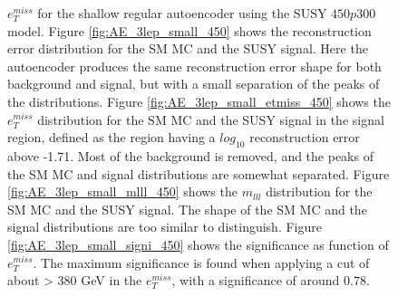 \begin{figure}[!htb]
{    $e_T^{miss}$ for the shallow regular autoencoder using the SUSY $450p300$ model. Figure \ref{fig:AE_3lep_small_450} shows the reconstruction error 
    distribution for the SM MC and the SUSY signal. Here the autoencoder produces the same reconstruction error shape for both background and 
    signal, but with a small separation of the peaks of the distributions. Figure \ref{fig:AE_3lep_small_etmiss_450} shows the $e_T^{miss}$ 
    distribution for the SM MC and the SUSY signal in the signal region, defined as the region having a $log_{10}$ 
    reconstruction error above -1.71. Most of 
    the background is removed, and the peaks of the SM MC and signal distributions are somewhat separated. Figure 
    \ref{fig:AE_3lep_small_mlll_450} shows the $m_{lll}$ distribution for the SM MC and the SUSY signal. 
    The shape of the SM MC and the signal distributions are too similar to distinguish. Figure \ref{fig:AE_3lep_small_signi_450} shows the significance as 
    function of $e_T^{miss}$. The maximum significance is found when applying a cut of about > 380 GeV in the $e_T^{miss}$, with a significance of around $0.78$.}
    \label{fig:AE_3lep_small_rec_sig_signi_450}
\end{figure}









